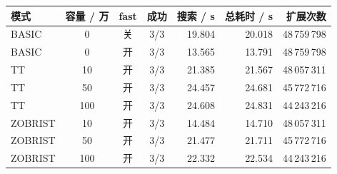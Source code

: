 \begin{tabular}{lcccrrr}
\toprule
\textbf{模式} & \textbf{容量 / 万} & \textbf{fast} & \textbf{成功} & \textbf{搜索 / s} & \textbf{总耗时 / s} & \textbf{扩展次数} \\
\midrule
BASIC & 0 & 关 & 3/3 & 19.804 & 20.018 & 48\,759\,798 \\
BASIC & 0 & 开 & 3/3 & 13.565 & 13.791 & 48\,759\,798 \\
TT & 10 & 开 & 3/3 & 21.385 & 21.567 & 48\,057\,311 \\
TT & 50 & 开 & 3/3 & 24.457 & 24.681 & 45\,772\,716 \\
TT & 100 & 开 & 3/3 & 24.608 & 24.831 & 44\,243\,216 \\
ZOBRIST & 10 & 开 & 3/3 & 14.484 & 14.710 & 48\,057\,311 \\
ZOBRIST & 50 & 开 & 3/3 & 21.477 & 21.711 & 45\,772\,716 \\
ZOBRIST & 100 & 开 & 3/3 & 22.332 & 22.534 & 44\,243\,216 \\
\bottomrule
\end{tabular}
